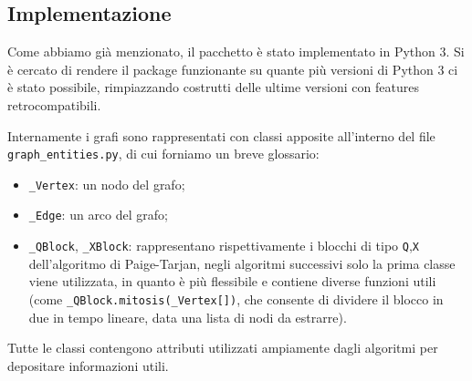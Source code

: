 \subsection{Implementazione}
Come abbiamo già menzionato, il pacchetto è stato implementato in Python 3. Si è cercato di rendere il package funzionante su quante più versioni di Python 3 ci è stato possibile, rimpiazzando costrutti delle ultime versioni con features retrocompatibili.

Internamente i grafi sono rappresentati con classi apposite all'interno del file \verb|graph_entities.py|, di cui forniamo un breve glossario:
\begin{itemize}
    \item \verb|_Vertex|: un nodo del grafo;
    \item \verb|_Edge|: un arco del grafo;
    \item \verb|_QBlock|, \verb|_XBlock|: rappresentano rispettivamente i blocchi di tipo \verb|Q|,\verb|X| dell'algoritmo di Paige-Tarjan, negli algoritmi successivi solo la prima classe viene utilizzata, in quanto è più flessibile e contiene diverse funzioni utili (come \verb|_QBlock.mitosis(_Vertex[])|, che consente di dividere il blocco in due in tempo lineare, data una lista di nodi da estrarre).
\end{itemize}
Tutte le classi contengono attributi utilizzati ampiamente dagli algoritmi per depositare informazioni utili.
